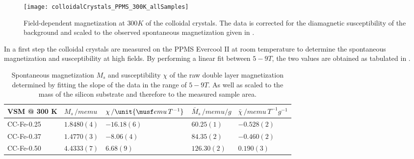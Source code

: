 \documentclass[\main/dresen_thesis.tex]{subfiles}
\begin{document}
  \label{sec:colloidalCrystals:vsm}

  \begin{figure}[tb]
    \centering
    \texttt{[image: colloidalCrystals\_PPMS\_300K\_allSamples]}
    \caption{\label{fig:colloidalCrystals:RTVSM}Field-dependent magnetization at $300 \unit{K}$ of the colloidal crystals. The data is corrected for the diamagnetic susceptibility of the background and scaled to the observed spontaneous magnetization given in .}
  \end{figure}

    In a first step the colloidal crystals are measured on the PPMS Evercool II at room temperature to determine the spontaneous magnetization and susceptibility at high fields.
    By performing a linear fit between $5 - 9 \unit{T}$, the two values are obtained as tabulated in .

    \begin{table}[!htbp]
      \centering
      \caption{\label{tab:colloidalCrystals:RTVSM:parameters} Spontaneous magnetization $M_s$ and susceptibility $\chi$ of the raw double layer magnetization determined by fitting the slope of the data in the range of $5 - 9 \unit{T}$. As well as scaled to the mass of the silicon substrate and therefore to the measured sample area.}
      \begin{tabular}{ l | l | l || l | l}
        \rule{0pt}{2ex} \textbf{VSM @ 300 K}
        & $M_s \, / \unit{memu}$
        & $\chi \, / \unit{\musf emu \, T ^{-1}}$
        & $\bar{M}_s \, / \unit{memu / g}$
        & $\bar{\chi} \, / \unit{memu \, T ^{-1} g^{-1}}$ \\
        \hline
        \rule{0pt}{2ex} CC-Fe-0.25    & $1.8480(4)$   & $-16.18(6)$ & $60.25(1)$  & $-0.528(2)$\\
        \rule{0pt}{2ex} CC-Fe-0.37    & $1.4770(3)$   & $-8.06(4)$  & $84.35(2)$  & $-0.460(2)$\\
        \rule{0pt}{2ex} CC-Fe-0.50    & $4.4333(7)$   & $6.68(9)$   & $126.30(2)$ & $0.190(3)$\\
        \hline
      \end{tabular}
    \end{table}
\end{document}
